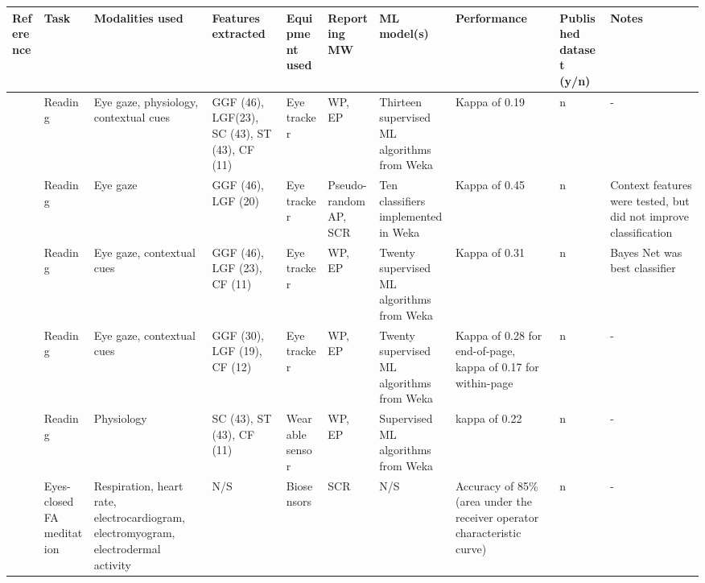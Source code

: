 \begin{landscape}
        \begin{adjustwidth}{-2cm}{}
\begin{xtabular}{p{18mm}p{22mm}p{26mm}p{18mm}p{24mm}p{18mm}p{2cm}p{2cm}p{15mm}p{2cm}}
  \toprule
  Reference & Task & Modalities used & Features extracted & Equipment used & Reporting MW & ML model(s) & Performance & Published dataset (y/n) & Notes \\
  \midrule
  \cite{Bixler2015AutomaticPhysiology}   &  Reading 	& Eye gaze, physiology, contextual cues & GGF (46), LGF(23), SC (43), ST (43), CF (11)  & Eye tracker   & WP, EP  &  Thirteen supervised ML algorithms from Weka        & Kappa of 0.19 & n & -\\\hline
  \cite{Bixler2015AutomaticAwareness}     &  Reading  & Eye gaze                              & GGF (46), LGF (20)                            & Eye tracker   & Pseudo-random AP, SCR  &  Ten classifiers implemented in Weka & Kappa of 0.45 & n & Context features were tested, but did not improve classification\\\hline
  \cite{Bixler2016AutomaticReading}       &  Reading 	& Eye gaze, contextual cues             & GGF (46), LGF (23), CF (11)                   & Eye tracker   & WP, EP & Twenty supervised ML algorithms from Weka            & Kappa of 0.31 & n & Bayes Net was best classifier\\\hline
  \cite{Bixler2014TowardWandering}        &  Reading  & Eye gaze, contextual cues             & GGF (30), LGF (19), CF (12)                   & Eye tracker   & WP, EP & Twenty supervised ML algorithms from Weka            & Kappa of 0.28 for end-of-page, kappa of 0.17 for within-page & n & -\\\hline
  \cite{Blanchard2014AutomatedLearning}   &  Reading	& Physiology                                                                                            & SC (43), ST (43), CF (11)                                                          & Wearable sensor & WP, EP                                     & Supervised ML algorithms from Weka & kappa of 0.22 & n & -\\\hline
  \cite{Cheetham2016AutomatedApplication} &  Eyes-closed FA meditation  	& Respiration, heart rate, electrocardiogram, electromyogram, electrodermal activity & N/S                                                                               & Biosensors  &  SCR                                           & N/S & Accuracy of 85\% (area under the receiver operator characteristic curve) & n & -\\\hline

\end{xtabular}
\end{adjustwidth}
\end{landscape}
